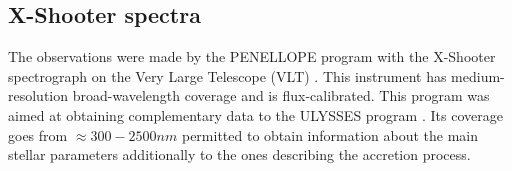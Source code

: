\documentclass[twocolumn,linenumbers]{aastex631}
\newcommand{\Mdot}{{\dot{{M}}}}
\newcommand{\msun}{ M_{\sun}}
\newcommand{\rsun}{ R_{\sun}}
\newcommand{\lsun}{ L_{\sun}}
\newcommand{\msunyr}{M_{\sun} \, \rm{ yr^{-1}}}
\newcommand{\teff}{T$_{\rm eff}$}
\begin{document}
\begin{table}[]
\caption{Stellar parameters of the CTTS sample \citep{manara2021}}

\centering
{}
\end{table}

\subsection{X-Shooter spectra}

The observations were made by the PENELLOPE program with the X-Shooter spectrograph on the Very Large Telescope (VLT) \citep{vernet2011}. This instrument has medium-resolution broad-wavelength coverage and is flux-calibrated. This program was aimed at obtaining complementary data to the ULYSSES program \citep{roman-duval2020}.  Its coverage goes from $\approx 300-2500nm$ permitted to obtain information about the main stellar parameters additionally to the ones describing the accretion process. 
\end{document}
